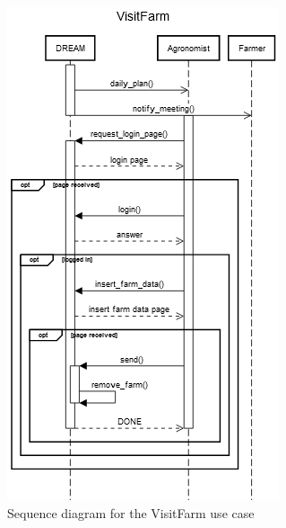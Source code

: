 \documentclass{article}
\begin{document}
\begin{figure}[H]
    \centering
    \includegraphics[scale=0.75]{sequence_diagrams/VisitFarm}
    \caption{Sequence diagram for the VisitFarm use case}
\end{figure}
\end{document}
